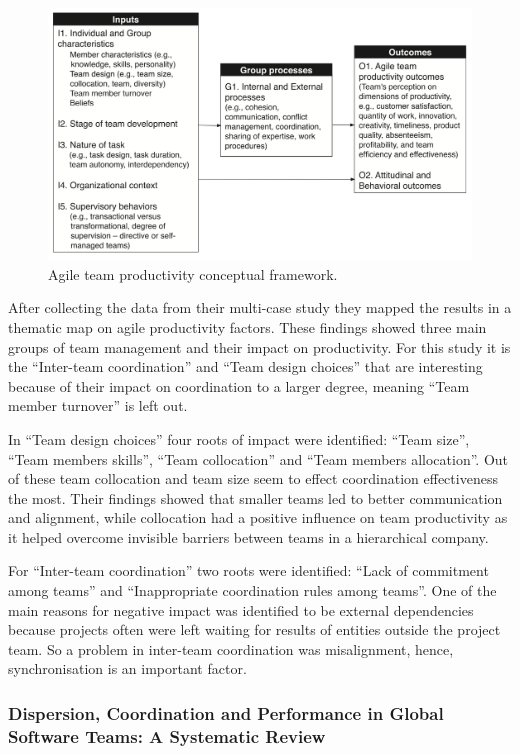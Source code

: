 \begin{figure}[ht!]
\centering
\includegraphics[width=150mm]{images/IPO.png}
\caption{Agile team productivity conceptual framework.}
\label{atpcf}
\end{figure}

After collecting the data from their multi-case study they mapped the results in a thematic map on agile productivity factors. These findings showed three main groups of team management and their impact on productivity. For this study it is the ``Inter-team coordination'' and ``Team design choices'' that are interesting because of their impact on coordination to a larger degree, meaning ``Team member turnover'' is left out. 

In ``Team design choices'' four roots of impact were identified: ``Team size'', ``Team members skills'', ``Team collocation'' and ``Team members allocation''. Out of these team collocation and team size seem to effect coordination effectiveness the most. Their findings showed that smaller teams led to better communication and alignment, while collocation had a positive influence on team productivity as it helped overcome invisible barriers between teams in a hierarchical company.

For ``Inter-team coordination'' two roots were identified: ``Lack of commitment among teams'' and ``Inappropriate coordination rules among teams''. One of the main reasons for negative impact was identified to be external dependencies because projects often were left waiting for results of entities outside the project team. So a problem in inter-team coordination was misalignment, hence, synchronisation is an important factor.

\subsubsection{Dispersion, Coordination and Performance in Global Software Teams: A Systematic Review}

